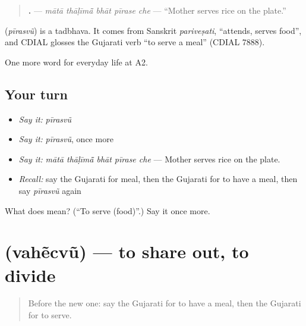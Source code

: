 \begin{quote}
\textbf{    .} — \emph{mātā thāḷīmā̃ bhāt pīrase che} — \textquotedblleft{}Mother serves rice on the plate.\textquotedblright{}
\end{quote}

\begin{cousinweb}
\textbf{} (\emph{pīrasvũ}) is a tadbhava. It comes from Sanskrit \emph{pariveṣati}, \textquotedblleft{}attends, serves food\textquotedblright{}, and CDIAL glosses the Gujarati verb \textquotedblleft{}to serve a meal\textquotedblright{} (CDIAL 7888).
\end{cousinweb}

\begin{grammarlens}[title={What you've built}]
One more word for everyday life at A2.
\end{grammarlens}

\subsection*{Your turn}
\begin{itemize}
\raggedright
  \item \emph{Say it:} \emph{pīrasvũ}
  \item \emph{Say it:} \emph{pīrasvũ}, once more
  \item \emph{Say it:} \emph{mātā thāḷīmā̃ bhāt pīrase che} — Mother serves rice on the plate.
  \item \emph{Recall:} say the Gujarati for meal, then the Gujarati for to have a meal, then say \emph{pīrasvũ} again
\end{itemize}

\begin{tcolorbox}[breakable,colback=teal!4,colframe=teal!35!black,title={Before you move on}]
What does  mean? (\textquotedblleft{}To serve (food)\textquotedblright{}.) Say it once more.
\end{tcolorbox}
\section[\texorpdfstring{\gu{વહેંચવું} (vahẽcvũ)}{વહેંચવું (vahẽcvũ)}]{ (vahẽcvũ) — to share out, to divide}

\label{lesson:GU-C163-vahecvu}



\begin{quote}
Before the new one: say the Gujarati for to have a meal, then the Gujarati for to serve.
\end{quote}


